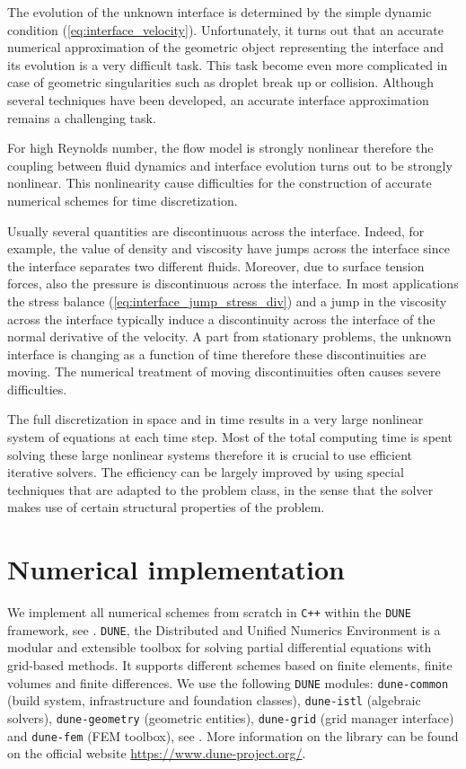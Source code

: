 The evolution of the unknown interface is determined by the simple dynamic
condition (\ref{eq:interface_velocity}). Unfortunately, it turns out that an
accurate numerical approximation of the geometric object representing the
interface and its evolution is a very difficult task. This task become even
more complicated in case of geometric singularities such as droplet break up or
collision. Although several techniques have been developed, an accurate
interface approximation remains a challenging task.

For high Reynolds number, the flow model is strongly nonlinear therefore the
coupling between fluid dynamics and interface evolution turns out to be strongly
nonlinear. This nonlinearity cause difficulties for the construction of
accurate numerical schemes for time discretization.

Usually several quantities are discontinuous across the interface. Indeed, for
example, the value of density and viscosity have jumps across the interface
since the interface separates two different fluids. Moreover, due to surface
tension forces, also the pressure is discontinuous across the interface. In
most applications the stress balance (\ref{eq:interface_jump_stress_div}) and a
jump in the viscosity across the interface typically induce a discontinuity
across the interface of the normal derivative of the velocity. A part from
stationary problems, the unknown interface is changing as a function of time
therefore these discontinuities are moving. The numerical treatment of moving
discontinuities often causes severe difficulties.

The full discretization in space and in time results in a very large nonlinear
system of equations at each time step. Most of the total computing time is
spent solving these large nonlinear systems therefore it is crucial to use
efficient iterative solvers. The efficiency can be largely improved by using
special techniques that are adapted to the problem class, in the sense that the
solver makes use of certain structural properties of the problem.

\section{Numerical implementation}\label{sec:numerical_implementation}
We implement all numerical schemes from scratch in \verb|C++| within the
\verb|DUNE| framework, see \cite{dunegridpaperI08,dunegridpaperII08}.
\verb|DUNE|, the Distributed and Unified Numerics Environment is a modular and
extensible toolbox for solving partial differential equations with grid-based
methods. It supports different schemes based on finite elements, finite volumes
and finite differences. We use the following \verb|DUNE| modules:
\verb|dune-common| (build system, infrastructure and foundation classes),
\verb|dune-istl| (algebraic solvers), \verb|dune-geometry| (geometric
entities), \verb|dune-grid| (grid manager interface) and \verb|dune-fem| (FEM
toolbox), see \cite{dunefempaper10}. More information on the library can be
found on the official website \url{https://www.dune-project.org/}.

